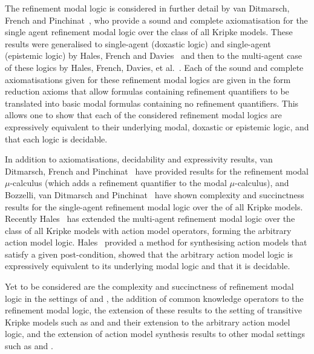 The refinement modal logic is considered in further detail by van Ditmarsch,
French and Pinchinat~\cite{vanditmarsch:2010}, who provide a sound and complete
axiomatisation for the single agent refinement modal logic over the class
\classK{} of all Kripke models. These results were generalised to single-agent
\classKD{} (doxastic logic) and single-agent \classS{} (epistemic logic) by
Hales, French and Davies~\cite{hales:2011a} and then to the multi-agent case of
these logics by Hales, French, Davies, et al.~\cite{hales:2011b, hales:2012,
bozzelli:2014b}. Each of the sound and complete axiomatisations given for these
refinement modal logics are given in the form reduction axioms that allow
formulas containing refinement quantifiers to be translated into basic modal
formulas containing no refinement quantifiers. This allows one to show that each
of the considered refinement modal logics are expressively equivalent to their
underlying modal, doxastic or epistemic logic, and that each logic is decidable.

In addition to axiomatisations, decidability and expressivity results, van
Ditmarsch, French and Pinchinat~\cite{vanditmarsch:2010} have provided results
for the refinement modal $\mu$-calculus (which adds a refinement quantifier to
the modal $\mu$-calculus), and Bozzelli, van Ditmarsch and
Pinchinat~\cite{bozzelli:2014a} have shown complexity and succinctness results
for the single-agent refinement modal logic over the \classK{} of all Kripke
models.  Recently Hales~\cite{hales:2013} has extended the multi-agent
refinement modal logic over the class \classK{} of all Kripke models with
action model operators, forming the arbitrary action model logic.
Hales~\cite{hales:2013} provided a method for synthesising action models that
satisfy a given post-condition, showed that the arbitrary action model logic is
expressively equivalent to its underlying modal logic and that it is decidable.

Yet to be considered are the complexity and succinctness of refinement modal
logic in the settings of \classKD{} and \classS{}, the addition of common
knowledge operators to the refinement modal logic, the extension of these
results to the setting of transitive Kripke models such as \classKF{} and
\classSF{} and their extension to the arbitrary action model logic, and the
extension of action model synthesis results to other modal settings such as
\classKD{} and \classS{}.
